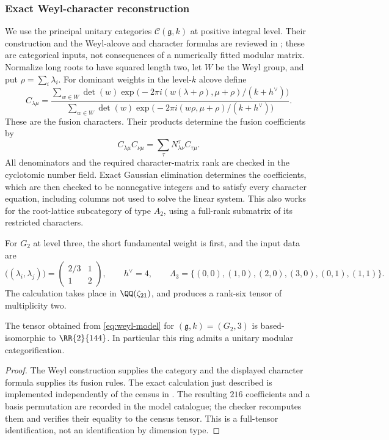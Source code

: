 

\subsubsection{Exact Weyl-character reconstruction}
We use the principal unitary categories $\mathcal C(\mathfrak g,k)$
at positive integral level. Their construction and the Weyl-alcove and
character formulas are reviewed in \cite{QGsurvey}; these are categorical
inputs, not consequences of a numerically fitted modular matrix. Normalize
long roots to have squared length two, let $W$ be the Weyl group, and put
$\rho=\sum_i\lambda_i$. For dominant weights in the level-$k$ alcove define
\begin{equation}\label{eq:weyl-model}
 C_{\lambda\mu}=\frac{\sum_{w\in W}\det(w)
 \exp\bigl(-2\pi i(w(\lambda+\rho),\mu+\rho)/(k+h^\vee)\bigr)}
 {\sum_{w\in W}\det(w)
 \exp\bigl(-2\pi i(w\rho,\mu+\rho)/(k+h^\vee)\bigr)}.
\end{equation}
These are the fusion characters. Their products determine the fusion
coefficients by
\[
 C_{\lambda\mu}C_{\nu\mu}=\sum_\tau N_{\lambda\nu}^{\tau}C_{\tau\mu}.
\]
All denominators and the required character-matrix rank are checked in the
cyclotomic number field. Exact Gaussian elimination determines the
coefficients, which are then checked to be nonnegative integers and to
satisfy every character equation, including columns not used to solve the
linear system. This also works for the root-lattice subcategory of type
$A_2$, using a full-rank submatrix of its restricted characters.

For $G_2$ at level three, the short fundamental weight is first, and the
input data are
\[
 \bigl((\lambda_i,\lambda_j)\bigr)=
 \begin{pmatrix}2/3&1\\1&2\end{pmatrix},\qquad h^\vee=4,
 \qquad\Lambda_3=\{(0,0),(1,0),(2,0),(3,0),(0,1),(1,1)\}.
\]
The calculation takes place in $\QQ(\zeta_{21})$, and produces a
rank-six tensor of multiplicity two.
\begin{proposition}\label{prop:g2model}
The tensor obtained from \eqref{eq:weyl-model} for $(\mathfrak g,k)=(G_2,3)$
is based-isomorphic to $\RR{2}{144}$. In particular this ring admits a
unitary modular categorification.
\end{proposition}
\begin{proof}
The Weyl construction supplies the category and the displayed character
formula supplies its fusion rules. The exact calculation just described
is implemented independently of the census in
. The resulting $216$ coefficients
and a basis permutation are recorded in the model catalogue; the checker
recomputes them and verifies their equality to the census tensor. This is
a full-tensor identification, not an identification by dimension type.
\end{proof}

